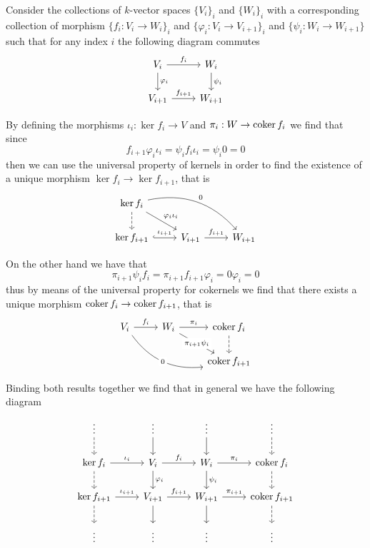 Consider the collections of \(k\)-vector spaces \(\{V_i\}_i\) and \(\{W_i\}_i\)
with a corresponding collection of morphism \(\{f_i : V_i \to W_i\}_i\) and
\(\{\varphi_i : V_i \to V_{i+1}\}_i\) and \(\{\psi_i : W_i \to W_{i+1}\}\) such
that for any index \(i\) the following diagram commutes
\[
\begin{tikzcd}
  V_i \rar["f_i"] \dar["\varphi_i"] &W_i \dar["\psi_i"]
  \\
  V_{i+1} \rar["f_{i+1}"] &W_{i+1}
\end{tikzcd}
\]

By defining the morphisms \(\iota_i : \ker f_i \to V\) and \(\pi_i : W \to
\operatorname{coker} f_i\) we find that since
\[
f_{i+1}  \varphi_i  \iota_i
= \psi_i  f_i  \iota_i
= \psi_i  0 = 0
\]
then we can use the universal property of kernels in order to find the existence
of a unique morphism \(\ker f_i \to \ker f_{i+1}\), that is
\[
\begin{tikzcd}
  \ker f_i \dar[dashed] \ar[dr, "\varphi_i  \iota_i"] \ar[drr, bend
  left, "0"] & &
  \\
  \ker f_{i+1} \rar[hook, "\iota_{i+1}"] &V_{i+1} \rar["f_{i+1}"] &W_{i+1}
\end{tikzcd}
\]

On the other hand we have that
\[
\pi_{i+1}  \psi_i  f_i
= \pi_{i+1}  f_{i+1}  \varphi_i
= 0  \varphi_i = 0
\]
thus by means of the universal property for cokernels we find that there exists
a unique morphism \(\operatorname{coker} f_i \to \operatorname{coker} f_{i+1}\), that is
\[
\begin{tikzcd}
  V_i \rar["f_i"] \ar[drr, bend right, "0" description]
    &W_i \rar["\pi_i"] \ar[dr, "\pi_{i+1}  \psi_i" description]
  &\coker f_i \dar[dashed]
  \\
  & &\coker f_{i+1}
\end{tikzcd}
\]

Binding both results together we find that in general we have the following
diagram
\[
\begin{tikzcd}
  \vdots \dar[dashed] &\vdots \dar &\vdots \dar &\vdots \dar[dashed]
  \\
  \ker f_i \rar["\iota_i"] \dar[dashed]
    &V_i \rar["f_i"] \dar["\varphi_i"]
  &W_i \dar["\psi_i"] \rar["\pi_i"]
    &\coker f_i \dar[dashed]
  \\
  \ker f_{i+1} \rar["\iota_{i+1}"] \dar[dashed]
    &V_{i+1} \rar["f_{i+1}"] \dar
  &W_{i+1} \rar["\pi_{i+1}"] \dar
    &\coker f_{i+1} \dar[dashed]
  \\
  \vdots &\vdots &\vdots &\vdots
\end{tikzcd}
\]

